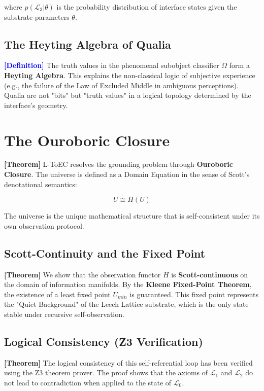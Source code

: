 \documentclass[11pt,titlepage]{article}
\newcommand{\substrate}{\mathcal{L}_0}
\newcommand{\protocol}{\mathcal{L}_1}
\newcommand{\logic}{\mathcal{L}_2}
\newcommand{\interface}{\mathcal{L}_3}
\newcommand{\classifier}{\Omega}
\newcommand{\tagdef}{\textcolor{blue}{\textbf{[Definition]}} }
\newcommand{\tagtheo}{\textcolor{green!60!black}{\textbf{[Theorem]}} }
\begin{document}
where $p(\interface | \theta)$ is the probability distribution of interface states given the substrate parameters $\theta$.

\subsection{The Heyting Algebra of Qualia}
\tagdef The truth values in the phenomenal subobject classifier $\classifier$ form a \textbf{Heyting Algebra}. This explains the non-classical logic of subjective experience (e.g., the failure of the Law of Excluded Middle in ambiguous perceptions). Qualia are not "bits" but "truth values" in a logical topology determined by the interface's geometry.


\section{The Ouroboric Closure}
\label{sec:ouroboros}
\tagtheo L-ToEC resolves the grounding problem through \textbf{Ouroboric Closure}. The universe is defined as a Domain Equation in the sense of Scott's denotational semantics:

\begin{equation}
U \cong H(U)
\end{equation}

The universe is the unique mathematical structure that is self-consistent under its own observation protocol. 

\subsection{Scott-Continuity and the Fixed Point}
\tagtheo We show that the observation functor $H$ is \textbf{Scott-continuous} on the domain of information manifolds. By the \textbf{Kleene Fixed-Point Theorem}, the existence of a least fixed point $U_{min}$ is guaranteed. This fixed point represents the "Quiet Background" of the Leech Lattice substrate, which is the only state stable under recursive self-observation.

\subsection{Logical Consistency (Z3 Verification)}
\tagtheo The logical consistency of this self-referential loop has been verified using the Z3 theorem prover. The proof shows that the axioms of $\protocol$ and $\logic$ do not lead to contradiction when applied to the state of $\substrate$.
\end{document}
